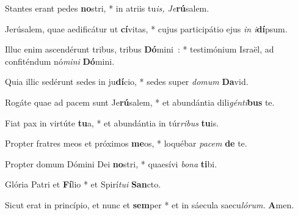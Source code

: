 \vs Stantes erant pedes \textbf{no}stri, * in atriis tu\textit{is, Je}\textbf{rú}salem.

\vs Jerúsalem, quae aedificátur ut \textbf{cí}vitas, * cujus participátio ejus \textit{in i}\textbf{dí}psum.

\vs Illuc enim ascendérunt tribus, tribus \textbf{Dó}mini~: * testimónium Israël, ad confiténdum nó\textit{mini} \textbf{Dó}mini.

\vs Quia illic sedérunt sedes in ju\textbf{dí}cio, * sedes super \textit{domum} \textbf{Da}vid.

\vs Rogáte quae ad pacem sunt Je\-\textbf{rú}\-sa\-lem, * et abundántia dili\textit{génti}\textbf{bus} te.

\vs Fiat pax in virtúte \textbf{tu}a, * et abundántia in túr\textit{ribus} \textbf{tu}is.

\vs Propter fratres meos et próximos \textbf{me}os, * loquébar \textit{pacem} \textbf{de} te.

\vs Propter domum Dómini Dei \textbf{no}stri, * quaesívi \textit{bona} \textbf{ti}bi.

\vs Glória Patri et \textbf{Fí}lio * et Spirí\textit{tui} \textbf{San}cto.

\vs Sicut erat in princípio, et nunc et \textbf{sem}per * et in sáecula saecu\textit{lórum.} \textbf{A}men.

